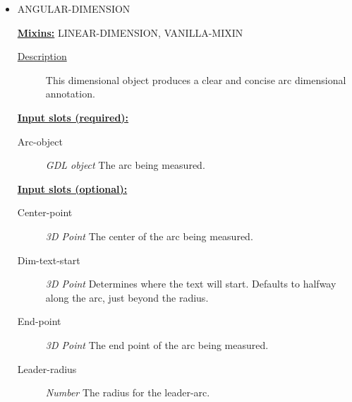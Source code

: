 \documentclass [11pt]{book}
\begin{document}
\begin{itemize}

\item {}ANGULAR-DIMENSION


\textbf{
\underline{Mixins:}} LINEAR-DIMENSION, VANILLA-MIXIN





\begin{description}

\item [
\underline{Description}]


This dimensional object produces a clear and concise arc dimensional annotation.



\end{description}








\textbf{
\underline{Input slots (required):}}

\begin{description}

\item [Arc-object]
\emph{GDL object} The arc being measured.


\end{description}






\textbf{
\underline{Input slots (optional):}}

\begin{description}

\item [Center-point]
\emph{3D Point} The center of the arc being measured.


\item [Dim-text-start]
\emph{3D Point} Determines where the text will start. Defaults to halfway along the arc, just beyond the radius.


\item [End-point]
\emph{3D Point} The end point of the arc being measured.


\item [Leader-radius]
\emph{Number} The radius for the leader-arc.



\end{description}
\end{itemize}
\end{document}
